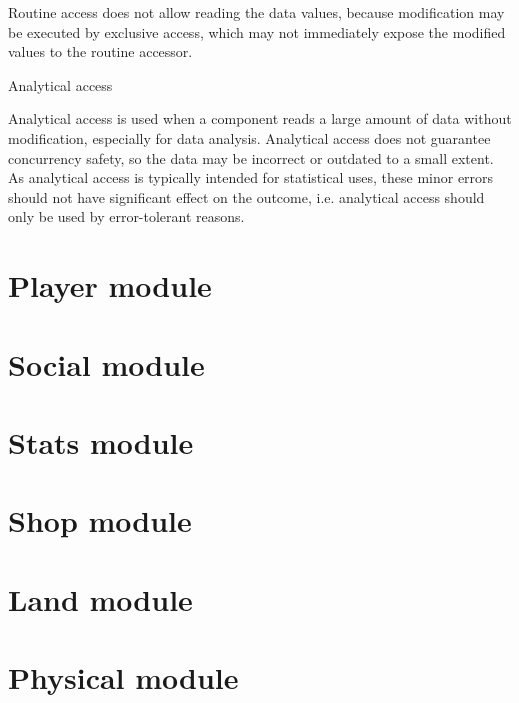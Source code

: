 \documentclass{report}
\begin{document}
					Routine access does not allow reading the data values, because modification may be executed by exclusive access, which may not immediately expose the modified values to the routine accessor.

					\subparagraph{Analytical access} Analytical access is used when a component reads a large amount of data without modification, especially for data analysis. Analytical access does not guarantee concurrency safety, so the data may be incorrect or outdated to a small extent. As analytical access is typically intended for statistical uses, these minor errors should not have significant effect on the outcome, i.e. analytical access should only be used by error-tolerant reasons.

	\part{Player module}

	\part{Social module}

	\part{Stats module}

	\part{Shop module}

	\part{Land module}

	\part{Physical module}
\end{document}

